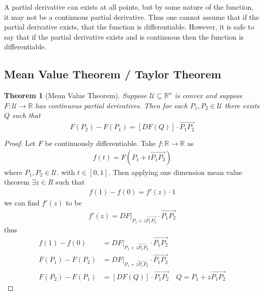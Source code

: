 \documentclass[12pt]{armath}
\newtheorem{theorem}{Theorem}[section]
\newcommand{\U}{\mathcal{U}}
\newcommand{\ra}{\rightarrow}
\newcommand{\R}{\mathbb{R}}
\begin{document}
A partial derivative can exists at all points, but by some nature of the
function, it may not be a continuous partial derivative. Thus one cannot assume
that if the partial derivative exists, that the function is differentiable.
However, it is safe to say that if the partial derivative exists and is
continuous then the function is differentiable.

\subsection{Mean Value Theorem / Taylor Theorem}%
\label{sub:mean_value_theorem_taylor_theorem}

\begin{theorem}[Mean Value Theorem]
  Suppose $\U\subseteq\R^n$ is convex and suppose $F:\U\ra\R$ has continuous
  partial derivatives. Then for each $P_1,P_2\in\U$ there exists $Q$ such that
  \[
    F(P_2)-F(P_1)=[DF(Q)]\cdot\overrightarrow{P_1P_2}
  \]
\end{theorem}

\begin{proof}
  Let $F$ be continuously differentiable. Take $f:\R\ra\R$ as
  \begin{align*}
    f(t)=F(P_1+t\overrightarrow{P_1P_2})
  \end{align*}
  where $P_1,P_2\in\U$. with $t\in[0,1]$. Then applying one dimension mean
  value theorem $\exists z\in R$ such that
  \begin{align*}
    f(1)-f(0)=f'(z)\cdot 1
  \end{align*}
  we can find $f'(z)$ to be
  \begin{align*}
    f'(z)=DF\vert_{P_1+z\overrightarrow{P_1P_2}}\cdot\overrightarrow{P_1P_2}
  \end{align*}
  thus
  \begin{align*}
    f(1)-f(0)&=DF\vert_{P_1+z\overrightarrow{P_1P_2}}\cdot\overrightarrow{P_1P_2}\\
    F(P_1)-F(P_2)&=DF\vert_{P_1+z\overrightarrow{P_1P_2}}\cdot\overrightarrow{P_1P_2}\\
    F(P_2)-F(P_1)&=[DF(Q)]\cdot\overrightarrow{P_1P_2}\quad
    Q=P_1+z\overrightarrow{P_1P_2}
  \end{align*}
\end{proof}
\end{document}
